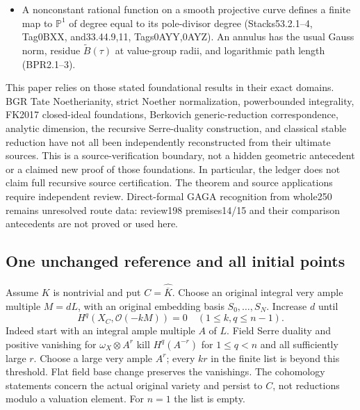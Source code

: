 \documentclass[
  11pt,
]{article}
\begin{document}
\begin{itemize}
  algebraically closed nontrivial rank-one field admits a semistable
  vertex set (BPR4.22). Any finite type-II set can be included, and
  deleting finitely many algebraic points permits a refinement retaining
  every old edge with its old logarithmic length (BPR3.13). This uses
  the ordinary stable reduction theorem, whose analytic rank-one
  application is stated in BPR's proof via BL85 Theorem7.1. Universal
  formal realization of arbitrary polarized graph data is not a premise.
\item
  A nonconstant rational function on a smooth projective curve defines a
  finite map to \(\mathbb P^1\) of degree equal to its pole-divisor
  degree (Stacks53.2.1--4, Tag0BXX, and33.44.9,11, Tags0AYY,0AYZ). An
  annulus has the usual Gauss norm, residue \(\widetilde B(\tau)\) at
  value-group radii, and logarithmic path length (BPR2.1--3).
\end{itemize}

This paper relies on those stated foundational results in their exact
domains. BGR Tate Noetherianity, strict Noether normalization,
powerbounded integrality, FK2017 closed-ideal foundations, Berkovich
generic-reduction correspondence, analytic dimension, the recursive
Serre-duality construction, and classical stable reduction have not all
been independently reconstructed from their ultimate sources. This is a
source-verification boundary, not a hidden geometric antecedent or a
claimed new proof of those foundations. In particular, the ledger does
not claim full recursive source certification. The theorem and source
applications require independent review. Direct-formal GAGA recognition
from whole250 remains unresolved route data: review198 premises14/15 and
their comparison antecedents are not proved or used here.

\subsection{One unchanged reference and all initial
points}\label{one-unchanged-reference-and-all-initial-points}

Assume \(K\) is nontrivial and put \(C=\widehat{\overline K}\). Choose
an original integral very ample multiple \(M=dL\), with an original
embedding basis \(S_0,\ldots,S_N\). Increase \(d\) until \[
 H^q(X_C,\mathcal O(-kM))=0
 \quad(1\leq k,q\leq n-1). \tag{4.1}
\] Indeed start with an integral ample multiple \(A\) of \(L\). Field
Serre duality and positive vanishing for \(\omega_X\otimes A^r\) kill
\(H^q(A^{-r})\) for \(1\leq q<n\) and all sufficiently large \(r\).
Choose a large very ample \(A^r\); every \(kr\) in the finite list is
beyond this threshold. Flat field base change preserves the vanishings.
The cohomology statements concern the actual original variety and
persist to \(C\), not reductions modulo a valuation element. For \(n=1\)
the list is empty.
\end{document}
